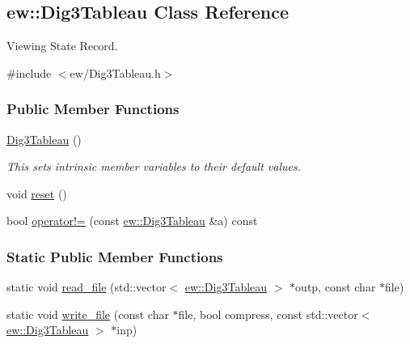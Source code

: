 \hypertarget{classew_1_1Dig3Tableau}{
\subsection{ew::Dig3Tableau Class Reference}
\label{classew_1_1Dig3Tableau}
}


Viewing State Record.  




{\ttfamily \#include $<$ew/Dig3Tableau.h$>$}

\subsubsection*{Public Member Functions}
\begin{DoxyCompactItemize}
\item 
\hypertarget{classew_1_1Dig3Tableau_a093ba4facab01a36f8a131f38d3dc4d2}{
\hyperlink{classew_1_1Dig3Tableau_a093ba4facab01a36f8a131f38d3dc4d2}{Dig3Tableau} ()}
\label{classew_1_1Dig3Tableau_a093ba4facab01a36f8a131f38d3dc4d2}

\begin{DoxyCompactList}\small\item\em This sets intrinsic member variables to their default values. \item\end{DoxyCompactList}\item 
void \hyperlink{classew_1_1Dig3Tableau_aa8f042e3995367fdeb3dfc612b75fcab}{reset} ()
\item 
bool \hyperlink{classew_1_1Dig3Tableau_adb42bf7da4ce08240005b9262a22d4f6}{operator!=} (const \hyperlink{classew_1_1Dig3Tableau}{ew::Dig3Tableau} \&a) const 
\end{DoxyCompactItemize}
\subsubsection*{Static Public Member Functions}
\begin{DoxyCompactItemize}
\item 
static void \hyperlink{classew_1_1Dig3Tableau_ac74f443090f0591aed7b3934e69fdb80}{read\_\-file} (std::vector$<$ \hyperlink{classew_1_1Dig3Tableau}{ew::Dig3Tableau} $>$ $\ast$outp, const char $\ast$file)
\item 
static void \hyperlink{classew_1_1Dig3Tableau_ab8a6e764e4145174c813511b38784800}{write\_\-file} (const char $\ast$file, bool compress, const std::vector$<$ \hyperlink{classew_1_1Dig3Tableau}{ew::Dig3Tableau} $>$ $\ast$inp)
\end{DoxyCompactItemize}
